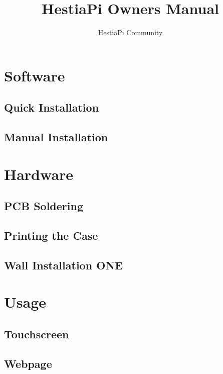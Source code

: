 \documentclass{article}
\begin{document}
\title{HestiaPi Owners Manual}
\author{HestiaPi Community}
\maketitle


\section{Software}
\subsection{Quick Installation}


\subsection{Manual Installation}



\section{Hardware}
\subsection{PCB Soldering}


\subsection{Printing the Case}


\subsection{Wall Installation ONE}



\section{Usage}
\subsection{Touchscreen} \label{Touchscreen}

\subsection{Webpage}

%
\end{document}
